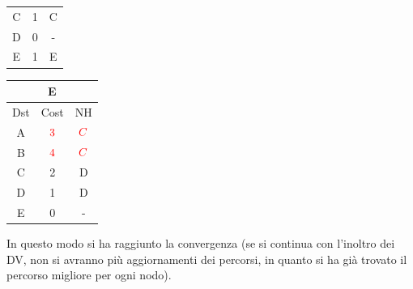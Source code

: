 \documentclass[10pt]{article}
\begin{document}
\begin{table}[h!]
\begin{tabular}{|c||c||c|}
 			C & 1 & C \\
 			D & 0 & - \\
 			E & 1 & E \\
 			\hline
		\end{tabular}
		\begin{tabular}{|c||c||c|}
 			\hline
	 		\multicolumn{3}{|c|}{E} \\
 			\hline
 			Dst & Cost & NH\\
 			\hline
 			A & $\color{red} 3$ & $\color{red} C$ \\
 			B & $\color{red} 4$ & $\color{red} C$ \\
 			C & 2 & D \\
 			D & 1 & D \\
 			E & 0 & - \\
 			\hline
		\end{tabular}
	\end{table}
	\newline \newline
	In questo modo si ha raggiunto la convergenza (se si continua con l'inoltro dei DV, non si avranno più aggiornamenti dei percorsi, in quanto si ha già trovato il percorso migliore per ogni nodo).
\end{document}
